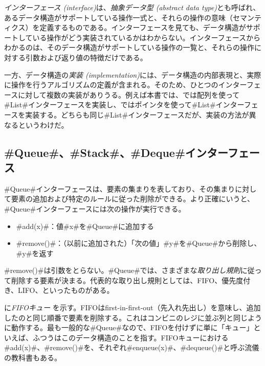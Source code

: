 \emph{インターフェース (interface)}は、\emph{抽象データ型 (abstract data type)}とも呼ばれ、あるデータ構造がサポートしている操作一式と、それらの操作の意味（セマンティクス）を定義するものである。インターフェースを見ても、データ構造がサポートしている操作がどう実装されているかはわからない。インターフェースからわかるのは、そのデータ構造がサポートしている操作の一覧と、それらの操作に対する引数および返り値の特徴だけである。 %

一方、データ構造の\emph{実装 (implementation)}には、データ構造の内部表現と、実際に操作を行うアルゴリズムの定義が含まれる。そのため、ひとつのインターフェースに対して複数の実装がありうる。例えば本書では、では配列を使って#List#インターフェースを実装し、ではポインタを使って#List#インターフェースを実装する。どちらも同じ#List#インターフェースだが、実装の方法が異なるというわけだ。

\subsection{#Queue#、#Stack#、#Deque#インターフェース}

#Queue#インターフェースは、要素の集まりを表しており、その集まりに対して要素の追加および特定のルールに従った削除ができる。より正確にいうと、#Queue#インターフェースには次の操作が実行できる。

\begin{itemize}
  \item #add(x)#：値#x#を#Queue#に追加する
  \item #remove()#：（以前に追加された）「次の値」#y#を#Queue#から削除し、#y#を返す
\end{itemize}

#remove()#は引数をとらない。#Queue#では、さまざまな\emph{取り出し規則}に従って削除する要素が決まる。代表的な取り出し規則としては、FIFO、優先度付き、LIFO、といったものがある。 %

に\emph{FIFOキュー} を示す。FIFOはfirst-in-first-out（先入れ先出し）を意味し、追加したのと同じ順番で要素を削除する。これはコンビニのレジに並ぶ列と同じように動作する。最も一般的な#Queue#なので、FIFOを付けずに単に「キュー」といえば、ふつうはこのデータ構造のことを指す。FIFOキューにおける#add(x)#、#remove()#を、それぞれ#enqueue(x)#、#dequeue()#と呼ぶ流儀の教科書もある。

